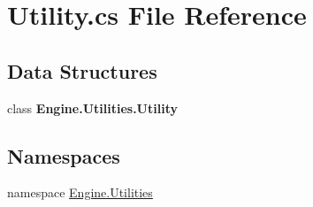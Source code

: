 \hypertarget{a00233}{}\section{Utility.\+cs File Reference}
\label{a00233}
\subsection*{Data Structures}
\begin{DoxyCompactItemize}
\item 
class {\bfseries Engine.\+Utilities.\+Utility}
\end{DoxyCompactItemize}
\subsection*{Namespaces}
\begin{DoxyCompactItemize}
\item 
namespace \hyperlink{a00281}{Engine.\+Utilities}
\end{DoxyCompactItemize}
